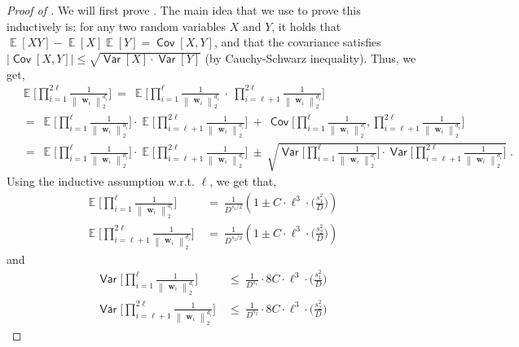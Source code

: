 \documentclass[11pt]{article}
\newcommand{\inparen}[1]{\left ( #1 \right )}
\newcommand{\norm}[2]{\begin{Vmatrix} #2 \end{Vmatrix}_{#1}}
\DeclareMathOperator*{\Ex}{\mathbb{E}}
\DeclareMathOperator*{\Var}{\mathsf{Var}}
\DeclareMathOperator*{\Cov}{\mathsf{Cov}}
\newcommand{\bw}{{\bm w}}
\begin{document}
\begin{proof}[Proof of ]
	We will first prove . The main idea that we use to prove this inductively is: for any two random variables $X$ and $Y$, it holds that $\Ex[XY] - \Ex[X] \Ex[Y] = \Cov[X,Y]$, and that the covariance satisfies $|\Cov[X,Y]| \le \sqrt{\Var[X] \cdot \Var[Y]}$ (by Cauchy-Schwarz inequality). Thus, we get,
	\begin{align}\label{eq:cov_manip}
		&\Ex\bigg[\prod_{i=1}^{2\ell} \frac{1}{\norm{2}{\bw_i}^{d_i}} \bigg]
		~=~ \Ex\bigg[\prod_{i=1}^{\ell} \frac{1}{\norm{2}{\bw_i}^{d_i}} \ \cdot \  \prod_{i=\ell+1}^{2\ell} \frac{1}{\norm{2}{\bw_i}^{d_i}} \bigg]\nonumber\\
		&~=~ \Ex\bigg[\prod_{i=1}^{\ell} \frac{1}{\norm{2}{\bw_i}^{d_i}} \bigg] \cdot \Ex\bigg[ \prod_{i=\ell+1}^{2\ell} \frac{1}{\norm{2}{\bw_i}^{d_i}}\bigg] ~+~ \Cov\bigg[\prod_{i=1}^{\ell} \frac{1}{\norm{2}{\bw_i}^{d_i}} , \prod_{i=\ell+1}^{2\ell} \frac{1}{\norm{2}{\bw_i}^{d_i}} \bigg] \nonumber\\ 
		&~=~ \Ex\bigg[\prod_{i=1}^{\ell} \frac{1}{\norm{2}{\bw_i}^{d_i}} \bigg] \cdot \Ex\bigg[ \prod_{i=\ell+1}^{2\ell} \frac{1}{\norm{2}{\bw_i}^{d_i}}\bigg] ~\pm~ \sqrt{\Var\bigg[\prod_{i=1}^{\ell} \frac{1}{\norm{2}{\bw_i}^{d_i}} \bigg] \cdot \Var\bigg[ \prod_{i=\ell+1}^{2\ell} \frac{1}{\norm{2}{\bw_i}^{d_i}}\bigg]}\;.
	\end{align}
	Using the inductive assumption w.r.t. $\ell$, we get that,
	\begin{align}
	\Ex\bigg[ \prod_{i=1}^{\ell}       \frac{1}{\norm{2}{\bw_i}^{d_i}}\bigg] &~=~ \frac{1}{D^{s_1/2}} \inparen{1 \pm C \cdot \ell^3 \cdot \bigg(\frac{s_1^2}{D} \bigg)} \label{eq:exp_ind1}\\
	\Ex\bigg[ \prod_{i=\ell+1}^{2\ell} \frac{1}{\norm{2}{\bw_i}^{d_i}}\bigg] &~=~ \frac{1}{D^{s_2/2}} \inparen{1 \pm C \cdot \ell^3 \cdot \bigg(\frac{s_2^2}{D} \bigg)} \label{eq:exp_ind2}
	\end{align}
	and
	\begin{align}
		\Var\bigg[ \prod_{i=1}^{\ell}       \frac{1}{\norm{2}{\bw_i}^{d_i}}\bigg] &~\le~ \frac{1}{D^{s_1}} \cdot 8C \cdot \ell^3 \cdot \bigg(\frac{s_1^2}{D} \bigg) \label{eq:var_ind1}\\
		\Var\bigg[ \prod_{i=\ell+1}^{2\ell} \frac{1}{\norm{2}{\bw_i}^{d_i}}\bigg] &~\le~ \frac{1}{D^{s_2}} \cdot 8C \cdot \ell^3 \cdot \bigg(\frac{s_2^2}{D} \bigg) \label{eq:var_ind2}
	\end{align}

\end{proof}
\end{document}
